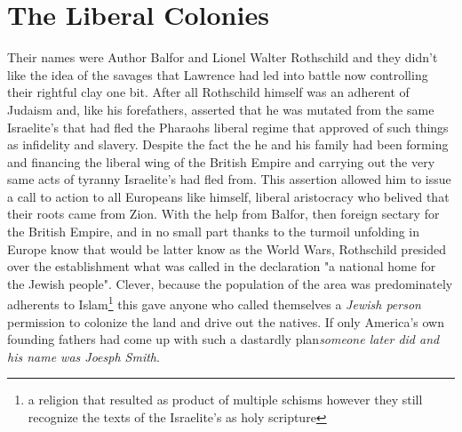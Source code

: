 \documentclass{article}
\begin{document}
\section{The Liberal Colonies}

Their names were Author Balfor and Lionel Walter Rothschild and they didn't like the idea of the savages that Lawrence had led into battle now controlling their rightful clay one bit. After all Rothschild himself was an adherent of Judaism and, like his forefathers, asserted that he was mutated from the same Israelite's that had fled the Pharaohs liberal regime that approved of such things as infidelity and slavery. Despite the fact the he and his family had been forming and financing the liberal wing of the British Empire and carrying out the very same acts of tyranny Israelite's had fled from. This assertion allowed him to issue a call to action to all Europeans like himself, liberal aristocracy who belived that their roots came from Zion. With the help from Balfor, then foreign sectary for the British Empire, and in no small part thanks to the turmoil unfolding in Europe know that would be latter know as the World Wars, Rothschild presided over the establishment what was called in the declaration "a national home for the Jewish people". Clever, because the population of the area was predominately adherents to Islam\footnote{a religion that resulted as product of multiple schisms however they still recognize the texts of the Israelite's as holy scripture} this gave anyone who called themselves a \textit{Jewish person} permission to colonize the land and drive out the natives. If only America's own founding fathers had come up with such a dastardly plan\textit{someone later did and his name was Joesph Smith}.
\end{document}
